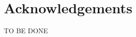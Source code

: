 \documentclass[10pt]{book}
\begin{document}
\chapter*{Acknowledgements}
TO BE DONE

\setcounter{tocdepth}{1}
\tableofcontents






\end{document}
